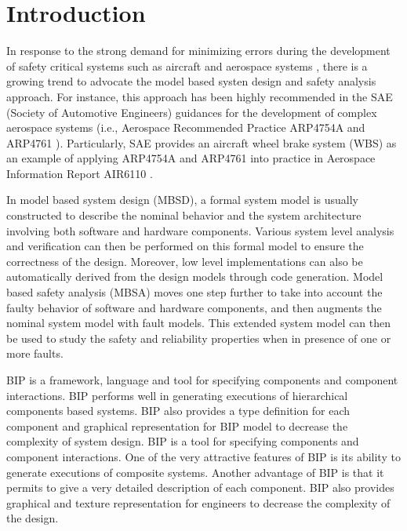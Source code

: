 
\section{Introduction}

In response to the strong demand for minimizing errors during the development of safety critical systems such as aircraft and aerospace systems \cite{lctes10,issrew12},
  there is a growing trend to advocate the model based systen design and safety analysis approach.
  For instance,  this approach has been highly recommended in the SAE (Society of Automotive Engineers) guidances for the development of complex aerospace systems 
  (i.e., Aerospace Recommended Practice ARP4754A \cite{arp4754a} and ARP4761 \cite{arp4761}).
  Particularly, SAE provides an aircraft wheel brake system (WBS) as an example of applying ARP4754A and ARP4761 into practice 
  in Aerospace Information Report AIR6110 \cite{air6110}.

 In model based system design (MBSD),
 a formal system model is usually constructed to describe the nominal behavior and the system architecture involving both software and hardware components.
 Various system level analysis and verification can then be performed on this formal model to ensure the correctness of the design.
 Moreover, low level implementations can also be automatically derived from the design models through code generation.
 Model based safety analysis (MBSA) moves one step further to take into account the faulty behavior of software and hardware components,
 and then augments the nominal system model with fault models.
 This extended system model can then be used to study the safety and reliability properties when  in presence of one or more faults.

BIP is a framework, language and tool for specifying components and component interactions. 
 BIP performs well in generating executions of hierarchical components based systems. 
 BIP also provides a type definition for each component and graphical representation for BIP model to decrease the complexity of system design.
 BIP is a tool for specifying components and component interactions. 
 One of the very attractive features of BIP is its ability to generate executions of composite systems.  
 Another advantage of BIP is that it permits to give a very detailed description of each component. 
 BIP also provides graphical and texture representation for engineers to decrease the complexity of the design.



